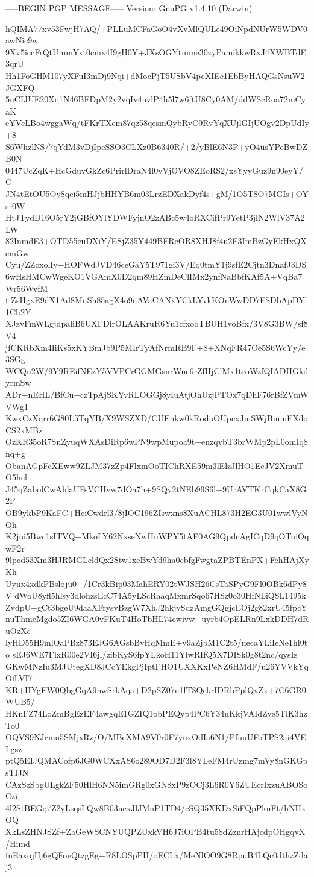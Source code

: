 -----BEGIN PGP MESSAGE-----
Version: GnuPG v1.4.10 (Darwin)

hQIMA77xv53FwjH7AQ/+PLLuMCFaGoO4vXvMlQULe49OiNpdNUrW5WDV0awNic9w
9Xv5iccFrQtUmmYxt0cmx4I9gH0Y+JXsOGYtmme30zyPamikkwRxJ4XWBTdE3qrU
Hh1FoGHM107yXFuI3mDj9Nqi+dMocPjT5USbV4pcXIEc1EbByHAQGsNsuW2JGXFQ
5nCIJUE20Xq1N46BFDpM2y2vqIv4nvlP4h5l7w6ftU8Cy0AM/ddWScRoa72mCyaK
eYVcLBo4wggaWq/tFKrTXem87qz58qcsmQybRyC9RvYqXUjlGIjUOgv2DpUdIy+8
S6WhzlNS/7qYdM3vDjIpeSSO3CLXz0B6340R/+2/yBlE6N3P+yO4usYPeBwDZB0N
0447UcZqK+HcGduvGkZc6PrirlDraN4l0vVjOVO8ZEoRS2/xsYyyGuz9n90eyY/C
JN4tEtOU5Oy8qei5mHJjbHHYB6m03LrzEDXakDyf4s+gM/1O5T8O7MGIs+OYsr0W
HtJTydD16O5rY2jGBfOYlYDWFyjnO2zABc5w4oRXCifPr9YetP3jlN2WlV37A2LW
82InmdE3+OTD55euDXiY/ESjZ35Y449BFRcOR8XHJ8f4u2F3ImBzGyEkHxQXemGw
Cyu/ZZoxolIy+HOFWdJVD46ceGaY5T971gi3V/Eq0tmY1j9sfE2Cjtn3DnafJ3DS
6wHsHMCwWgeKO1VGAmX0D2qm89HZmDeClIMx2ynfNaBbfKAf5A+VqBa7Wr56WvfM
tiZsHgxE9dX1Ad8MnSh85agX4o9nAVaCANxYCkLYvkKOnWwDD7FSDbApDYl1Ch2Y
XJzvFmWLgjdpaliB6UXFDlrOLAAKruR6Yu1cfxooTBUH1voBfx/3V8G3BW/sf8V4
jfCKRbXm4IiKs5xKYBmJb9P5MIrTyAfNrmItB9F+8+XNqFR47Oe5S6WcYy/e3SGg
WCQn2W/9Y9REifNEzY5VVPCrGGMGsnrWne6rZfHjClMx1troWzfQIADHGkdyrmSw
ADr+nEHL/BfCu+czTpAjSKYvRLOGGj8yIuAtjOhUzjPTOx7qDhF76rBfZVmWVWg1
KwxCzXqrr6G80L5TqYB/X9WSZXD/CUEnkw0kRodpOUpcxJmSWjBmmFXdoCS2xMBz
OzKR35oR7SnZyuqWXAsDiRp6wPN9wpMupoa9t+enzqvbT3brWMp2pL0omIq8nq+g
ObanAGpFcXEww9ZLJM37zZp4FlxmOoTIChRXE59m3lElzJlHO1EcJV2XmuTO5hcl
J45qZabolCwAhlaUFsVCIIvw7dOa7h+9SQy2tNEb99S6l+9UrAVTKrCqkCaX8G2P
OB9ykbP9KaFC+HciCwdrl3/8jIOC196ZIswxns8XuACHL873H2EG3U01wwlVyNQh
K2jni5Bwc1sITVQ+MkoLY62NxseNwHuWPY5tAF0AG9QpdcAgICqD9qOTniOqwF2r
9lpcd53Xm3HJRMGLcldQx2Stw1xeBwYd9ha0cbfgFwgtaZPBTEnPX+FehHAjXyKh
Uyux4xdkPBsloju0+/1Cr3kBip03MahERY02tWJSH26CsTaSPyG9Fl0OBk6dPy8V
dWoU8yfl5hlsy3dlohzsEcC74A5yLScRaaqMxmrSqo67HSz0o30HfNLiQSL1495k
ZvdpU+gCt3bgeU9daaXFrysvBzgW7XhJ2hkjvSdzAmgGQgjcEOj2g82xrU45fpcY
nuThmeMgdo5ZI6WGA0vFKuT4HoTbHL74cwivw+uyrb4OpELRn9LxkDDH7dRuOzXc
lyHD55H9mlOaPBz873EJG6AGsbBvHqMmE+v9aZjbM1C2t5/necaYLiIeNe1hl0to
sEJ6WE7FlxR00e2VI6jl/zibKyS6fpYLkoH11YlwRIfQ5X7DISk0g8t2nc/qysIz
GKwMNzIu3MJUtegXD8JCcYEkgPjIptFHO1UXXKxPeNZ6HMdF/u26YVVkYqOiLVI7
KR+HYgEW0QbgGqA9nwSrkAqa+D2pSZ07u1lT8QckrIDRbPplQvZx+7C6GR0WUB5/
HKnFZ74LoZmBgEzEF4awgqE1GZIQ1obPEQyp4PC6Y34uKkjVAIdZye5TlK3hzTo0
OQVS9NJcmu5SMjxRz/O/MBeXMA9V0r0F7yuxOdIa6N1/PfuuUFoTPS2ai4VELgsz
ptQ5EIJQMACofp6JG0WCXxAS6o289OD7D2F3l8YLeFM4rUzmg7mVy8nGKGpsTIJN
CAzSzSbgULgkZF50HlH6NN5imGRg0xGN8xP9zOCj3L6R0Y6ZUEcrIxzuABOSoCzi
4l2StBEGq7Z2yLsqsLQw8B03ucxJlJMnP1TD4/cSQ35XKDxSiFQpPknFt/hNHxOQ
XkLsZHNJSZf+ZaGeWSCNYUQPZUxkVH6J7iOPB4tu58dZznrHAjcdpOHgqvX/Himd
fnEaxojHj6gQFoeQtzgEg+R8LOSpPH/oECLx/MeNlOO9G8RpuB4LQc0dthzZdaj3
